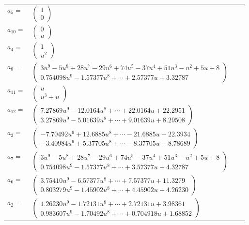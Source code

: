 \documentclass[1p]{elsarticle_modified}
\theoremstyle{definition}
\begin{document}
\begin{tabular}{m{7pt} m{180pt} m{7pt} m{180pt} }
\flushright $a_{5}=$&$\begin{pmatrix}1\\0\end{pmatrix}$ \\
\flushright $a_{10}=$&$\begin{pmatrix}0\\u\end{pmatrix}$ \\
\flushright $a_{4}=$&$\begin{pmatrix}1\\u^2\end{pmatrix}$ \\
\flushright $a_{8}=$&$\begin{pmatrix}3 u^9-5 u^8+28 u^7-29 u^6+74 u^5-37 u^4+51 u^3- u^2+5 u+8\\0.754098 u^{9}-1.57377 u^{8}+\cdots+2.57377 u+3.32787\end{pmatrix}$ \\
\flushright $a_{11}=$&$\begin{pmatrix}u\\u^3+u\end{pmatrix}$ \\
\flushright $a_{12}=$&$\begin{pmatrix}7.27869 u^{9}-12.0164 u^{8}+\cdots+22.0164 u+22.2951\\3.27869 u^{9}-5.01639 u^{8}+\cdots+9.01639 u+8.29508\end{pmatrix}$ \\
\flushright $a_{3}=$&$\begin{pmatrix}-7.70492 u^{9}+12.6885 u^{8}+\cdots-21.6885 u-22.3934\\-3.40984 u^{9}+5.37705 u^{8}+\cdots-8.37705 u-8.78689\end{pmatrix}$ \\
\flushright $a_{7}=$&$\begin{pmatrix}3 u^9-5 u^8+28 u^7-29 u^6+74 u^5-37 u^4+51 u^3- u^2+5 u+8\\0.754098 u^{9}-1.57377 u^{8}+\cdots+3.57377 u+4.32787\end{pmatrix}$ \\
\flushright $a_{6}=$&$\begin{pmatrix}3.75410 u^{9}-6.57377 u^{8}+\cdots+7.57377 u+11.3279\\0.803279 u^{9}-1.45902 u^{8}+\cdots+4.45902 u+4.26230\end{pmatrix}$ \\
\flushright $a_{2}=$&$\begin{pmatrix}1.26230 u^{9}-1.72131 u^{8}+\cdots+2.72131 u+3.98361\\0.983607 u^{9}-1.70492 u^{8}+\cdots+0.704918 u+1.68852\end{pmatrix}$ \\

\end{tabular}
\end{document}
